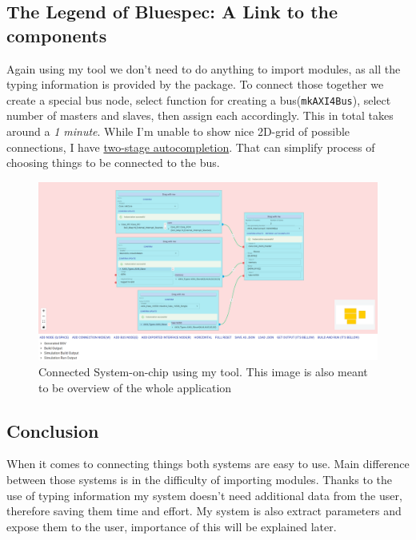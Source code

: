 \documentclass[12pt]{report}
\begin{document}
\subsection{The Legend of Bluespec: A Link to the components}
Again using my tool we don't need to do anything to import modules, as all the typing information is provided by the package. To connect those together we create a special bus node, select function for creating a bus(\verb!mkAXI4Bus!), select number of masters and slaves, then assign each accordingly. This in total takes around a \emph{1 minute}. While I'm unable to show nice 2D-grid of possible connections, I have \hyperref[sec:AutocompletionBusNode]{two-stage autocompletion}. That can simplify process of choosing things to be connected to the bus.

\begin{figure}[H]
    \label{fig:Overview}
    \caption{Connected System-on-chip using my tool. This image is also meant to be overview of the whole application}
    \includegraphics[width=\textwidth]{images/Example2MySolution.png}
    \centering
\end{figure}
\subsection{Conclusion}
When it comes to connecting things both systems are easy to use. Main difference between those systems is in the difficulty of importing modules. Thanks to the use of typing information my system doesn't need additional data from the user, therefore saving them time and effort. My system is also extract parameters and expose them to the user, importance of this will be explained later.
\end{document}
